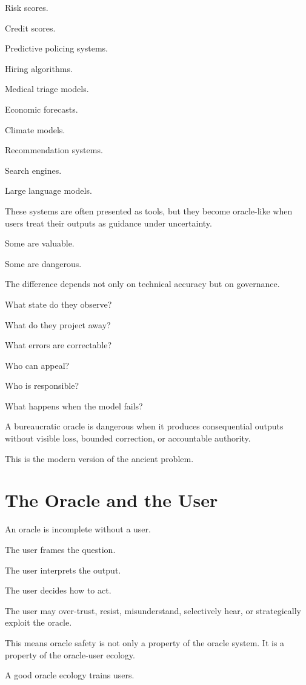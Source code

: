 \documentclass[11pt]{book}
\begin{document}
Risk scores.

Credit scores.

Predictive policing systems.

Hiring algorithms.

Medical triage models.

Economic forecasts.

Climate models.

Recommendation systems.

Search engines.

Large language models.

These systems are often presented as tools, but they become oracle-like when users treat their outputs as guidance under uncertainty.

Some are valuable.

Some are dangerous.

The difference depends not only on technical accuracy but on governance.

What state do they observe?

What do they project away?

What errors are correctable?

Who can appeal?

Who is responsible?

What happens when the model fails?

A bureaucratic oracle is dangerous when it produces consequential outputs without visible loss, bounded correction, or accountable authority.

This is the modern version of the ancient problem.

\section{The Oracle and the User}

An oracle is incomplete without a user.

The user frames the question.

The user interprets the output.

The user decides how to act.

The user may over-trust, resist, misunderstand, selectively hear, or strategically exploit the oracle.

This means oracle safety is not only a property of the oracle system. It is a property of the oracle-user ecology.

A good oracle ecology trains users.
\end{document}
